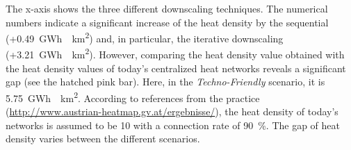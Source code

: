 The x-axis shows the three different downscaling techniques. The numerical numbers indicate a significant increase of the heat density by the sequential (+\SI{0.49}{GWh \per km^2}) and, in particular, the iterative downscaling (+\SI{3.21}{GWh \per km^2}). However, comparing the heat density value obtained with the heat density values of today's centralized heat networks reveals a significant gap (see the hatched pink bar). Here, in the \textit{Techno-Friendly} scenario, it is \SI{5.75}{GWh \per km^2}. According to references from the practice (\url{http://www.austrian-heatmap.gv.at/ergebnisse/}), the  heat density of today's networks is assumed to be \SI{10}{} with a connection rate of \SI{90}{\%}. The gap of heat density varies between the different scenarios. 
 
